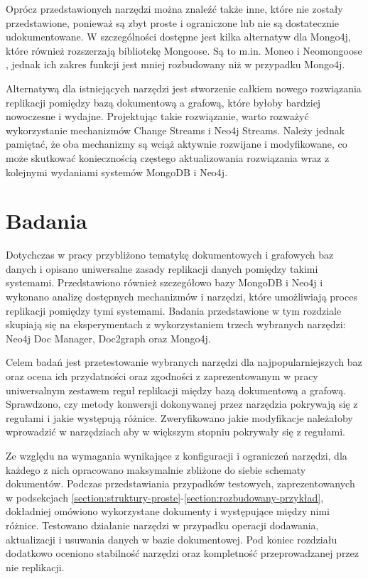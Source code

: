 \documentclass[a4paper,twoside,12pt]{book}
\begin{document}
Oprócz przedstawionych narzędzi można znaleźć także inne, które nie zostały przedstawione, ponieważ są zbyt proste i ograniczone lub nie są dostatecznie udokumentowane. W szczególności dostępne jest kilka alternatyw dla Mongo4j, które również rozszerzają bibliotekę Mongoose. Są to m.in. Moneo \cite{bib:moneo} i Neomongoose \cite{bib:neomongoose}, jednak ich zakres funkcji jest mniej rozbudowany niż w przypadku Mongo4j.

Alternatywą dla istniejących narzędzi jest stworzenie całkiem nowego rozwiązania replikacji pomiędzy bazą dokumentową a grafową, które byłoby bardziej nowoczesne i wydajne. Projektując takie rozwiązanie, warto rozważyć wykorzystanie mechanizmów Change Streams i Neo4j Streams. Należy jednak pamiętać, że oba mechanizmy są wciąż aktywnie rozwijane i modyfikowane, co może skutkować koniecznością częstego aktualizowania rozwiązania wraz z kolejnymi wydaniami systemów MongoDB i Neo4j.

\chapter{Badania}

Dotychczas w pracy przybliżono tematykę dokumentowych i grafowych baz danych i opisano uniwersalne zasady replikacji danych pomiędzy takimi systemami. Przedstawiono również szczegółowo bazy MongoDB i Neo4j i wykonano analizę dostępnych mechanizmów i narzędzi, które umożliwiają proces replikacji pomiędzy tymi systemami. Badania przedstawione w tym rozdziale skupiają się na eksperymentach z wykorzystaniem trzech wybranych narzędzi: Neo4j Doc Manager, Doc2graph oraz Mongo4j. 

Celem badań jest przetestowanie wybranych narzędzi dla najpopularniejszych baz oraz ocena ich przydatności oraz zgodności z zaprezentowanym w pracy uniwersalnym zestawem reguł replikacji między bazą dokumentową a grafową. Sprawdzono, czy metody konwersji dokonywanej przez narzędzia pokrywają się z regułami i jakie występują różnice. Zweryfikowano jakie modyfikacje należałoby wprowadzić w narzędziach aby w większym stopniu pokrywały się z regułami. 

Ze względu na wymagania wynikające z konfiguracji i ograniczeń narzędzi, dla każdego z nich opracowano maksymalnie zbliżone do siebie schematy dokumentów. Podczas przedstawiania przypadków testowych, zaprezentowanych w podsekcjach \ref{section:struktury-proste}-\ref{section:rozbudowany-przykład}, dokładniej omówiono wykorzystane dokumenty i występujące między nimi różnice. Testowano działanie narzędzi w przypadku operacji dodawania, aktualizacji i usuwania danych w bazie dokumentowej. Pod koniec rozdziału dodatkowo oceniono stabilność narzędzi oraz kompletność przeprowadzanej przez nie replikacji.
\end{document}
